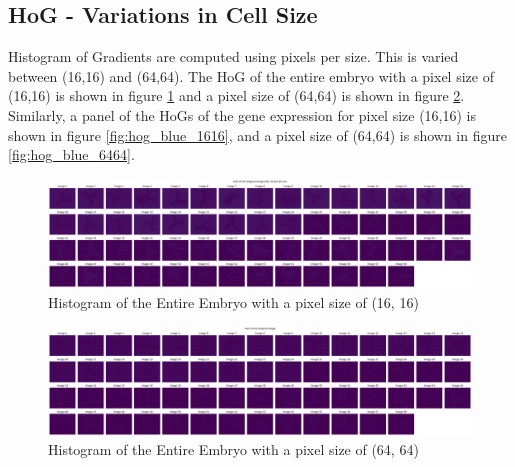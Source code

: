 \documentclass{article}
\begin{document}
\subsection*{HoG - Variations in Cell Size}

Histogram of Gradients are computed using pixels per size. This is varied between (16,16) and (64,64). 
The HoG of the entire embryo with a pixel size of (16,16) is shown in figure  \ref{fig:hog_original_1616} and a pixel size of (64,64) is shown in figure \ref{fig:hog_original_6464}. \\ Similarly, a panel of the HoGs of the gene expression for pixel size (16,16) is shown in figure \ref{fig:hog_blue_1616}, and a pixel size of (64,64) is shown in figure \ref{fig:hog_blue_6464}. 
\begin{landscape}
    \begin{figure}
    \centering
    \includegraphics[width=1\linewidth, keepaspectratio]{Report/Images/Appendix Images/HoG/HoG_original_16,16.png}
    \caption{Histogram of the Entire Embryo with a pixel size of (16, 16)}
    \label{fig:hog_original_1616}
\end{figure}
\end{landscape}
\clearpage

\begin{landscape}
    \begin{figure}
    \centering
    \includegraphics[width=1\linewidth, keepaspectratio]{Report/Images/Appendix Images/HoG/HoG_original_64,64.png}
    \caption{Histogram of the Entire Embryo with a pixel size of (64, 64)}
    \label{fig:hog_original_6464}
\end{figure}
\end{landscape}
\clearpage
\end{document}
